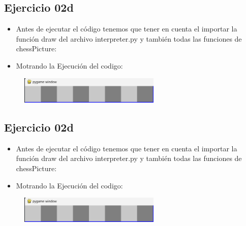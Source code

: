 \documentclass{article}
\begin{document}
	\subsection{Ejercicio 02d}
	\begin{itemize}	
		\item Antes de ejecutar el código tenemos que tener en cuenta el importar la función draw del archivo interpreter.py y también todas las funciones de chessPicture:
	\end{itemize}	

		

	\begin{itemize}	
		\item Motrando la Ejecución del codigo:
	\end{itemize}	

	\begin{figure}[H]
		\centering
		\includegraphics[width=0.6\textwidth,keepaspectratio]{img/Ejercicio2d.png}
	\end{figure}

	\subsection{Ejercicio 02d}
	\begin{itemize}	
		\item Antes de ejecutar el código tenemos que tener en cuenta el importar la función draw del archivo interpreter.py y también todas las funciones de chessPicture:
	\end{itemize}	

		

	\begin{itemize}	
		\item Motrando la Ejecución del codigo:
	\end{itemize}	

	\begin{figure}[H]
		\centering
		\includegraphics[width=0.6\textwidth,keepaspectratio]{img/Ejercicio2d.png}
	\end{figure}
\end{document}
